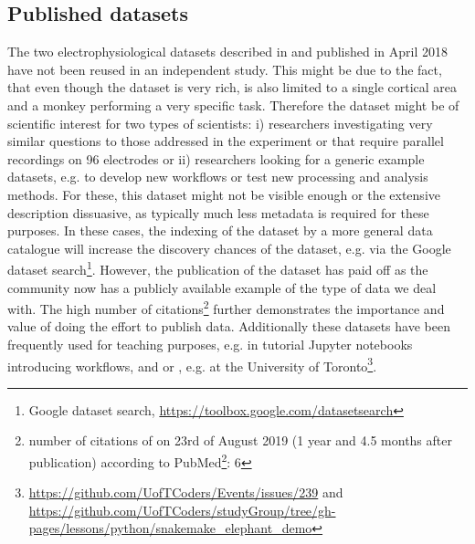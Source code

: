 \subsection{Published datasets}
The two electrophysiological datasets described in \citep{Brochier_2018} and published in April 2018 have not been reused in an independent study. This might be due to the fact, that even though the dataset is very rich, is also limited to a single cortical area and a monkey performing a very specific task. Therefore the dataset might be of scientific interest for two types of scientists: i) researchers investigating very similar questions to those addressed in the experiment or that require parallel recordings on 96 electrodes or ii) researchers looking for a generic example datasets, e.g. to develop new workflows or test new processing and analysis methods. For these, this dataset might not be visible enough or the extensive description dissuasive, as typically much less metadata is required for these purposes. In these cases, the indexing of the dataset by a more general data catalogue will increase the discovery chances of the dataset, e.g. via the Google dataset search\footnote{Google dataset search, \url{https://toolbox.google.com/datasetsearch}}.
However, the publication of the dataset has paid off as the community now has a publicly available example of the type of data we deal with. The high number of citations\footnote{number of citations of \citep{Brochier_2018} on 23rd of August 2019 (1 year and 4.5 months after publication) according to PubMed\footnote{\url{https://www.ncbi.nlm.nih.gov/pubmed?linkname=pubmed_pubmed_citedin&from_uid=29633986}}: 6} further demonstrates the importance and value of doing the effort to publish data. 
Additionally these datasets have been frequently used for teaching purposes, e.g. in tutorial Jupyter notebooks introducing  workflows,  and or , e.g. at the University of Toronto\footnote{\url{https://github.com/UofTCoders/Events/issues/239} and \url{https://github.com/UofTCoders/studyGroup/tree/gh-pages/lessons/python/snakemake_elephant_demo}}.

